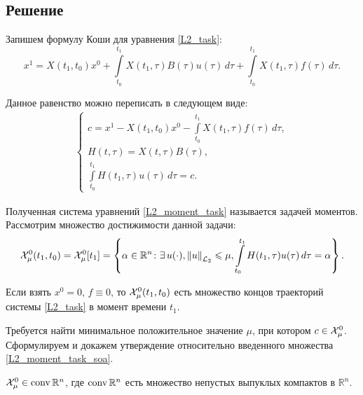 \subsection{Решение}

Запишем формулу Коши для уравнения \eqref{L2_task}:
\begin{equation*}
	x^1 = X(t_1, t_0) x^0 + \int\limits_{t_0}^{t_1} X(t_1, \tau) B(\tau) u(\tau)\,d\tau +
	\int\limits_{t_0}^{t_1} X(t_1, \tau) f(\tau)\,d\tau.
\end{equation*}

Данное равенство можно переписать в следующем виде:
\begin{gather}
\label{L2_moment_task}
	\begin{cases}
	  c = x^1 - X(t_1, t_0) x^0 - \int\limits_{t_0}^{t_1} X(t_1, \tau) f(\tau)\,d\tau,\\
	  H(t, \tau) = X(t, \tau) B(\tau),\\
	  \int\limits_{t_0}^{t_1} H(t_1, \tau) u(\tau)\,d\tau = c.
	\end{cases}
\end{gather}

Полученная система уравнений \eqref{L2_moment_task} называется задачей моментов.
Рассмотрим множество достижимости данной задачи:
\begin{equation}
\label{L2_moment_task_soa}
	\soa_\mu^0 (t_1, t_0) = \soa_\mu^0 [t_1] =
	\left\lbrace
	  \alpha \in \mathbb{R}^n \colon \exists u(\cdot), \norm{u}_{\LTwo} \leqslant \mu,	  
	  \int\limits_{t_0}^{t_1} H(t_1, \tau) u(\tau)\,d\tau = \alpha
	\right\rbrace.
\end{equation}

\begin{note}
  Если взять $x^0 = 0$, $f \equiv 0$, то $\mathcal{X}_\mu^0 (t_1, t_0)$ есть множество концов траекторий
  системы \eqref{L2_task} в момент времени $t_1$.
\end{note}

Требуется найти минимальное положительное значение $\mu$, при котором $c \in \mathcal{X}_\mu^0$.
Сформулируем и докажем утверждение относительно введенного множества \eqref{L2_moment_task_soa}.

\begin{stm}
	$\mathcal{X}_\mu^0 \in \operatorname{conv} \mathbb{R}^n$, где $\operatorname{conv} \mathbb{R}^n$ есть множество
	непустых выпуклых компактов в $\mathbb{R}^n$.
\end{stm}

